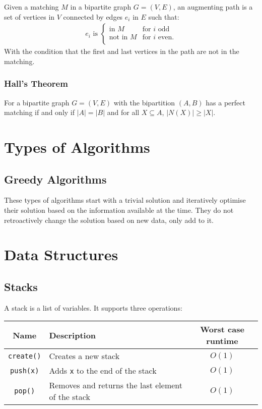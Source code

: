 \documentclass[a4paper, 12pt, twoside]{article}
\begin{document}
Given a matching $M$ in a bipartite graph $G = (V, E)$, 
an augmenting path is a set of vertices in $V$ connected
by edges $e_i$ in $E$ such that: \begin{align*}
  e_i \text{ is } \begin{cases}
    \text{in } M & \text{for } i \text{ odd} \\
    \text{not in } M & \text{for } i \text{ even}. \\
  \end{cases}
\end{align*} With the condition that the first and last vertices
in the path are not in the matching.

\subsubsection{Hall's Theorem}

For a bipartite graph $G = (V, E)$ with the bipartition $(A, B)$ has
a perfect matching if and only if $|A| = |B|$ and for all 
$X \subseteq A$, $|N(X)| \geq |X|$. 

\section{Types of Algorithms}

\subsection{Greedy Algorithms}

These types of algorithms start with a trivial solution and
iteratively optimise their solution based on the information
available at the time. They do not retroactively change the solution
based on new data, only add to it.

\section{Data Structures}

\subsection{Stacks}

A stack is a list of variables. It supports three operations:

\begin{center}
  \begin{tabular}{ || c | p{6.5cm} | c || }
    \hline
    Name & Description & Worst case runtime \\
    \hline
    \texttt{create()} & Creates a new stack & $O(1)$ \\
    \hline
    \texttt{push(x)} & Adds \texttt{x} to the end of the stack & $O(1)$ \\
    \hline
    \texttt{pop()} & Removes and returns the last element of the stack & $O(1)$ \\
    \hline
  \end{tabular}
\end{center}
\end{document}
